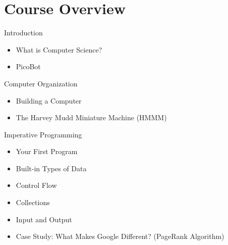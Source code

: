 \documentclass[8pt,a4paper,compress]{beamer}
\begin{document}
\section{Course Overview}

\begin{frame}[fragile]
\pause

Introduction
\begin{itemize}
\item What is Computer Science?
\item PicoBot
\end{itemize}

\pause
\bigskip

Computer Organization
\begin{itemize}
\item Building a Computer
\item The Harvey Mudd Miniature Machine (HMMM)
\end{itemize}

\pause
\bigskip

Imperative Programming
\begin{itemize}
\item Your First Program
\item Built-in Types of Data
\item Control Flow
\item Collections
\item Input and Output
\item Case Study: What Makes Google Different? (PageRank Algorithm)
\end{itemize}
\end{frame}
\end{document}
